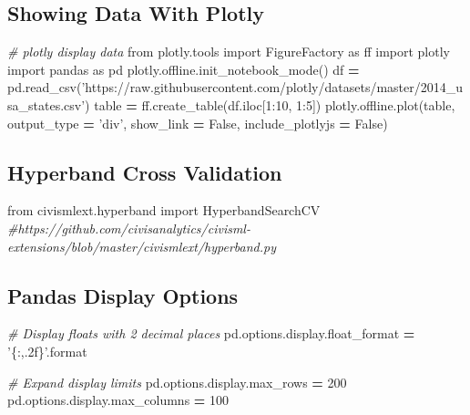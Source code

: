 \documentclass[]{book}
\newenvironment{Shaded}{\begin{snugshade}}{\end{snugshade}}
\newcommand{\DecValTok}[1]{\textcolor[rgb]{0.00,0.00,0.81}{#1}}
\newcommand{\StringTok}[1]{\textcolor[rgb]{0.31,0.60,0.02}{#1}}
\newcommand{\ImportTok}[1]{#1}
\newcommand{\CommentTok}[1]{\textcolor[rgb]{0.56,0.35,0.01}{\textit{#1}}}
\newcommand{\VariableTok}[1]{\textcolor[rgb]{0.00,0.00,0.00}{#1}}
\newcommand{\OperatorTok}[1]{\textcolor[rgb]{0.81,0.36,0.00}{\textbf{#1}}}
\newcommand{\BuiltInTok}[1]{#1}
\newcommand{\NormalTok}[1]{#1}
\theoremstyle{definition}
\theoremstyle{definition}
\theoremstyle{definition}
\theoremstyle{remark}
\begin{document}
\subsection{Showing Data With Plotly}\label{showing-data-with-plotly}

\begin{Shaded}
\begin{Highlighting}[]
\CommentTok{# plotly display data}
\ImportTok{from}\NormalTok{ plotly.tools }\ImportTok{import}\NormalTok{ FigureFactory }\ImportTok{as}\NormalTok{ ff}
\ImportTok{import}\NormalTok{ plotly}
\ImportTok{import}\NormalTok{ pandas }\ImportTok{as}\NormalTok{ pd}
\NormalTok{plotly.offline.init_notebook_mode()}
\NormalTok{df }\OperatorTok{=}\NormalTok{ pd.read_csv(}\StringTok{'https://raw.githubusercontent.com/plotly/datasets/master/2014_usa_states.csv'}\NormalTok{)}
\NormalTok{table }\OperatorTok{=}\NormalTok{ ff.create_table(df.iloc[}\DecValTok{1}\NormalTok{:}\DecValTok{10}\NormalTok{, }\DecValTok{1}\NormalTok{:}\DecValTok{5}\NormalTok{])}
\NormalTok{plotly.offline.plot(table, output_type }\OperatorTok{=} \StringTok{'div'}\NormalTok{, show_link }\OperatorTok{=} \VariableTok{False}\NormalTok{, include_plotlyjs }\OperatorTok{=} \VariableTok{False}\NormalTok{)}
\end{Highlighting}
\end{Shaded}

\subsection{Hyperband Cross
Validation}\label{hyperband-cross-validation}

\begin{Shaded}
\begin{Highlighting}[]
\ImportTok{from}\NormalTok{ civismlext.hyperband }\ImportTok{import}\NormalTok{ HyperbandSearchCV}
\CommentTok{#https://github.com/civisanalytics/civisml-extensions/blob/master/civismlext/hyperband.py}
\end{Highlighting}
\end{Shaded}

\subsection{Pandas Display Options}\label{pandas-display-options}

\begin{Shaded}
\begin{Highlighting}[]
\CommentTok{# Display floats with 2 decimal places}
\NormalTok{pd.options.display.float_format }\OperatorTok{=} \StringTok{'\{:,.2f\}'}\NormalTok{.}\BuiltInTok{format}
 
\CommentTok{# Expand display limits}
\NormalTok{pd.options.display.max_rows }\OperatorTok{=} \DecValTok{200}
\NormalTok{pd.options.display.max_columns }\OperatorTok{=} \DecValTok{100}
\end{Highlighting}
\end{Shaded}
\end{document}
